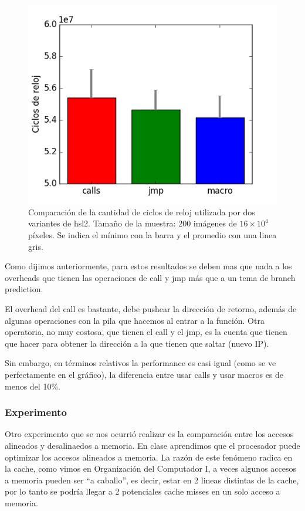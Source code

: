 \begin{figure}[H] 
	\centering
  \includegraphics[scale=0.7]{images/hsl-jmpcall.png}
  \caption{Comparación de la cantidad de ciclos de reloj utilizada por dos variantes de hsl2. Tamaño de la muestra: 200 imágenes de $16 \times 10^4$ píxeles. Se indica el mínimo con la barra y el promedio con una linea gris.}
\end{figure}

Como dijimos anteriormente, para estos resultados se deben mas que nada a los overheads que tienen las operaciones de call y jmp más que a un tema de branch prediction.

El overhead del call es bastante, debe pushear la dirección de retorno, además de algunas operaciones con la pila que hacemos al entrar a la función. Otra operatoria, no muy costosa, que tienen el call y el jmp, es la cuenta que tienen que hacer para obtener la dirección a la que tienen que saltar (nuevo IP).

Sin embargo, en términos relativos la performance es casi igual (como se ve perfectamente en el gráfico), la diferencia entre usar calls y usar macros es de menos del 10\%.




\subsubsection*{Experimento}
Otro experimento que se nos ocurrió realizar es la comparación entre los accesos alineados y desalinaedos a memoria. En clase aprendimos que el procesador puede optimizar los accesos alineados a memoria.
La razón de este fenómeno radica en la cache, como vimos en Organización del Computador I, a veces algunos accesos a memoria pueden ser ``a caballo'', es decir, estar en 2 lineas distintas de la cache, por lo tanto se podría llegar a 2 potenciales cache misses en un solo acceso a memoria.


